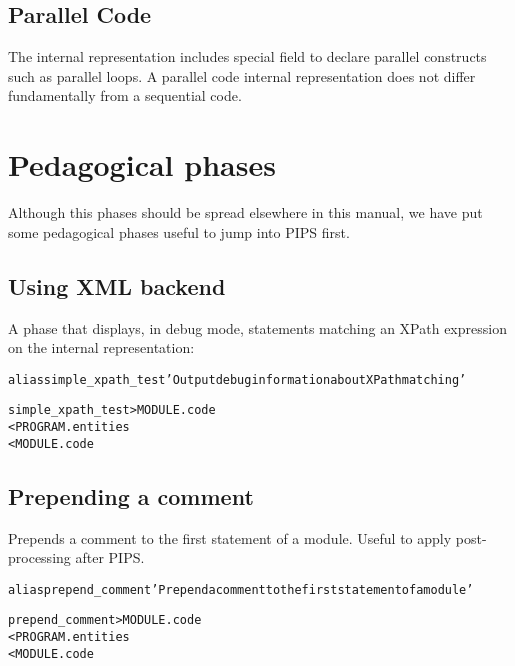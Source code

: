 \documentclass[a4paper]{report}
\newenvironment{PipsMake}{\begin{alltt}}{\end{alltt}}
\newenvironment{PipsPass}[1]{\label{pass:#1}}{}
\begin{document}
\section{Parallel Code}
\label{subsection-parallel-code}

The internal representation includes special field to declare parallel
constructs such as parallel loops. A parallel code internal
representation does not differ fundamentally from a sequential code.



\chapter{Pedagogical phases}
\label{cha:pedagogical-phases}

Although this phases should be spread elsewhere in this manual, we have
put some pedagogical phases useful to jump into PIPS first.


\section{Using XML backend}
\label{sec:using-xml-backend}

A phase that displays, in debug mode, statements matching an XPath
expression on the internal representation:

\begin{PipsMake}
alias simple_xpath_test 'Output debug information about XPath matching'

simple_xpath_test > MODULE.code
  < PROGRAM.entities
  < MODULE.code
\end{PipsMake}


\section{Prepending a comment}
\label{sec:prepending-comment}

\begin{PipsPass}{prepend_comment}
Prepends a comment to the first statement of a module.
Useful to apply post-processing after PIPS.
\end{PipsPass}

\begin{PipsMake}
alias prepend_comment 'Prepend a comment to the first statement of a module'

prepend_comment > MODULE.code
  < PROGRAM.entities
  < MODULE.code
\end{PipsMake}
\end{document}
